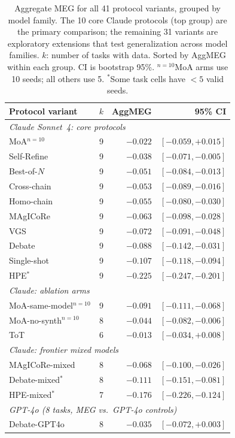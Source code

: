 \documentclass{article}
\begin{document}
\begin{table}[h]
\caption{Aggregate MEG for all 41 protocol variants, grouped by model family. The 10 core Claude protocols (top group) are the primary comparison; the remaining 31 variants are exploratory extensions that test generalization across model families. $k$: number of tasks with data. Sorted by AggMEG within each group. CI is bootstrap 95\%. $^{n=10}$MoA arms use 10 seeds; all others use 5. $^*$Some task cells have $<5$ valid seeds.}
\centering
\scriptsize
\begin{tabular}{l r r r}
\toprule
Protocol variant & $k$ & AggMEG & 95\% CI \\
\midrule
\multicolumn{4}{l}{\textit{Claude Sonnet~4: core protocols}} \\
MoA$^{n=10}$ & 9 & $-0.022$ & $[-0.059, +0.015]$ \\
Self-Refine & 9 & $-0.038$ & $[-0.071, -0.005]$ \\
Best-of-$N$ & 9 & $-0.051$ & $[-0.084, -0.013]$ \\
Cross-chain & 9 & $-0.053$ & $[-0.089, -0.016]$ \\
Homo-chain & 9 & $-0.055$ & $[-0.080, -0.030]$ \\
MAgICoRe & 9 & $-0.063$ & $[-0.098, -0.028]$ \\
VGS & 9 & $-0.072$ & $[-0.091, -0.048]$ \\
Debate & 9 & $-0.088$ & $[-0.142, -0.031]$ \\
Single-shot & 9 & $-0.107$ & $[-0.118, -0.094]$ \\
HPE$^*$ & 9 & $-0.225$ & $[-0.247, -0.201]$ \\
\midrule
\multicolumn{4}{l}{\textit{Claude: ablation arms}} \\
MoA-same-model$^{n=10}$ & 9 & $-0.091$ & $[-0.111, -0.068]$ \\
MoA-no-synth$^{n=10}$ & 8 & $-0.044$ & $[-0.082, -0.006]$ \\
ToT & 6 & $-0.013$ & $[-0.034, +0.008]$ \\
\midrule
\multicolumn{4}{l}{\textit{Claude: frontier mixed models}} \\
MAgICoRe-mixed & 8 & $-0.068$ & $[-0.100, -0.026]$ \\
Debate-mixed$^*$ & 8 & $-0.111$ & $[-0.151, -0.081]$ \\
HPE-mixed$^*$ & 7 & $-0.176$ & $[-0.226, -0.124]$ \\
\midrule
\multicolumn{4}{l}{\textit{GPT-4o (8 tasks, MEG vs.\ GPT-4o controls)}} \\
Debate-GPT4o & 8 & $-0.035$ & $[-0.072, +0.003]$ \\

\end{tabular}
\end{table}
\end{document}
